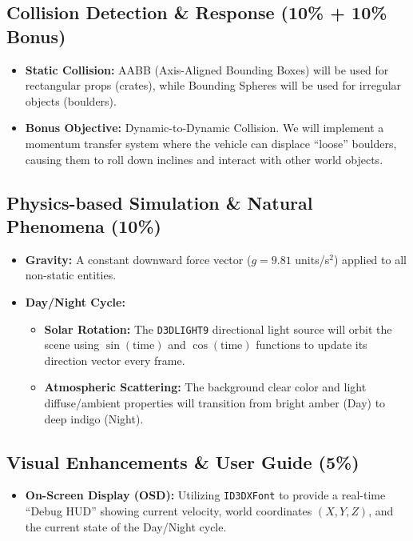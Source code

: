 \documentclass[11pt,a4paper]{article}
\begin{document}
\subsection{Collision Detection \& Response (10\% + 10\% Bonus)}

\begin{itemize}
  \item \textbf{Static Collision:} AABB (Axis-Aligned Bounding Boxes) will be used for rectangular props (crates), while Bounding Spheres will be used for irregular objects (boulders).
  \item \textbf{Bonus Objective:} Dynamic-to-Dynamic Collision. We will implement a momentum transfer system where the vehicle can displace ``loose'' boulders, causing them to roll down inclines and interact with other world objects.
\end{itemize}

\subsection{Physics-based Simulation \& Natural Phenomena (10\%)}

\begin{itemize}
  \item \textbf{Gravity:} A constant downward force vector ($g = 9.81$ units/s$^2$) applied to all non-static entities.
  \item \textbf{Day/Night Cycle:}
    \begin{itemize}
      \item \textbf{Solar Rotation:} The \texttt{D3DLIGHT9} directional light source will orbit the scene using $\sin(\text{time})$ and $\cos(\text{time})$ functions to update its direction vector every frame.
      \item \textbf{Atmospheric Scattering:} The background clear color and light diffuse/ambient properties will transition from bright amber (Day) to deep indigo (Night).
    \end{itemize}
\end{itemize}

\subsection{Visual Enhancements \& User Guide (5\%)}

\begin{itemize}
  \item \textbf{On-Screen Display (OSD):} Utilizing \texttt{ID3DXFont} to provide a real-time ``Debug HUD'' showing current velocity, world coordinates $(X, Y, Z)$, and the current state of the Day/Night cycle.
\end{itemize}
\end{document}
